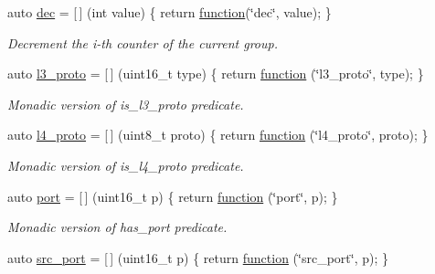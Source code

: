 \begin{DoxyCompactItemize}
auto \hyperlink{namespacepfq_1_1lang_1_1anonymous__namespace_02default_8hpp_03_a139906841e77a2eb86b761b27ceeb685}{dec} = \mbox{[}$\,$\mbox{]} (int value) \{ return \hyperlink{namespacepfq_1_1lang_a1a4638059d700ae08d0ca63886ff2bb3}{function}(\char`\"{}dec\char`\"{}, value); \}
\begin{DoxyCompactList}\small\item\em Decrement the i-\/th counter of the current group. \end{DoxyCompactList}\item 
auto \hyperlink{namespacepfq_1_1lang_1_1anonymous__namespace_02default_8hpp_03_a1515f230673119530cd04f213627976f}{l3\+\_\+proto} = \mbox{[}$\,$\mbox{]} (uint16\+\_\+t type) \{ return \hyperlink{namespacepfq_1_1lang_a1a4638059d700ae08d0ca63886ff2bb3}{function} (\char`\"{}l3\+\_\+proto\char`\"{}, type); \}
\begin{DoxyCompactList}\small\item\em Monadic version of {\ttfamily is\+\_\+l3\+\_\+proto} predicate. \end{DoxyCompactList}\item 
auto \hyperlink{namespacepfq_1_1lang_1_1anonymous__namespace_02default_8hpp_03_a8ad2208c91dc3cd4378e715aab5fb4b7}{l4\+\_\+proto} = \mbox{[}$\,$\mbox{]} (uint8\+\_\+t proto) \{ return \hyperlink{namespacepfq_1_1lang_a1a4638059d700ae08d0ca63886ff2bb3}{function} (\char`\"{}l4\+\_\+proto\char`\"{}, proto); \}
\begin{DoxyCompactList}\small\item\em Monadic version of {\ttfamily is\+\_\+l4\+\_\+proto} predicate. \end{DoxyCompactList}\item 
auto \hyperlink{namespacepfq_1_1lang_1_1anonymous__namespace_02default_8hpp_03_a868eca03290a037cb4e9b7075085888b}{port} = \mbox{[}$\,$\mbox{]} (uint16\+\_\+t p) \{ return \hyperlink{namespacepfq_1_1lang_a1a4638059d700ae08d0ca63886ff2bb3}{function} (\char`\"{}port\char`\"{}, p); \}
\begin{DoxyCompactList}\small\item\em Monadic version of {\ttfamily has\+\_\+port} predicate. \end{DoxyCompactList}\item 
auto \hyperlink{namespacepfq_1_1lang_1_1anonymous__namespace_02default_8hpp_03_ad1645151270994a4f396565b70233b73}{src\+\_\+port} = \mbox{[}$\,$\mbox{]} (uint16\+\_\+t p) \{ return \hyperlink{namespacepfq_1_1lang_a1a4638059d700ae08d0ca63886ff2bb3}{function} (\char`\"{}src\+\_\+port\char`\"{}, p); \}

\end{DoxyCompactItemize}
